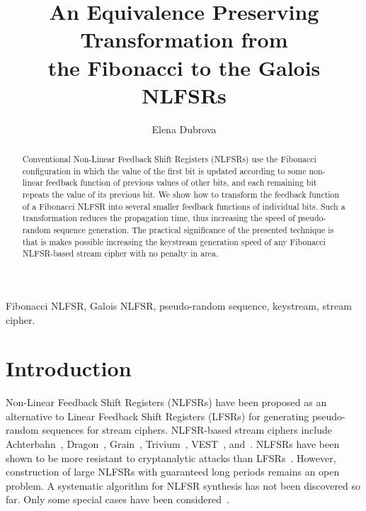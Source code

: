 \documentclass{llncs}
\begin{document}
\title{An Equivalence Preserving Transformation from \\ the Fibonacci to the Galois NLFSRs}
\author{Elena Dubrova}

\maketitle

\begin{abstract}
Conventional Non-Linear Feedback Shift Registers (NLFSRs) use the
Fibonacci configuration in which the value of the first bit is updated
according to some non-linear feedback function of previous values of
other bits, and each remaining bit repeats the value of its previous
bit.  We show how to transform the feedback function of a Fibonacci
NLFSR into several smaller feedback functions of individual bits. Such
a transformation reduces the propagation time, thus increasing the
speed of pseudo-random sequence generation. The practical significance
of the presented technique is that is makes possible increasing the
keystream generation speed of any Fibonacci NLFSR-based stream cipher
with no penalty in area.
\end{abstract}

 Fibonacci NLFSR, Galois NLFSR, pseudo-random sequence, 
keystream, stream cipher.

\section{Introduction}

Non-Linear Feedback Shift Registers (NLFSRs) have been proposed as an
alternative to Linear Feedback Shift Registers (LFSRs) for generating
pseudo-random sequences for stream ciphers. NLFSR-based stream ciphers
include Achterbahn~\cite{GaGK07}, Dragon~\cite{CHM05}, Grain~\cite{hell-grain},
Trivium~\cite{canniere-trivium}, VEST~\cite{cryptoeprint:2005:415},
and~\cite{GaGK06}. NLFSRs have been shown to be more resistant to
cryptanalytic attacks than LFSRs~\cite{1241371,Ca05}.  However,
construction of large NLFSRs with guaranteed long periods remains an
open problem. A systematic algorithm for NLFSR synthesis has not been
discovered so far. Only some special cases have been
considered~\cite{Golomb_book,Mykkeltveit77,MykkeltveitST79,Ro84,Ja89,Ro92,603256,838191,JaS04}.
\end{document}
